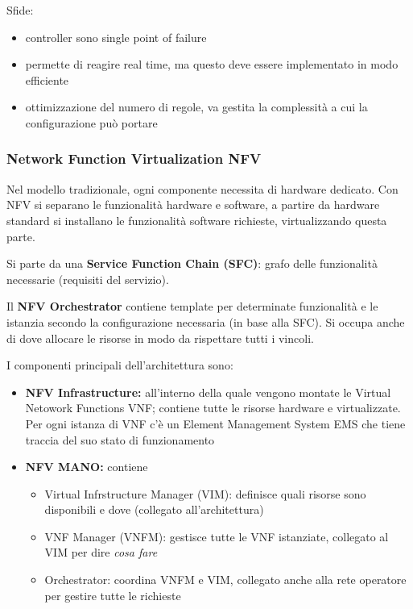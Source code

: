 Sfide: 
\begin{itemize}
    \item controller sono single point of failure
    
    \item permette di reagire real time, ma questo deve essere implementato in modo efficiente
    
    \item ottimizzazione del numero di regole, va gestita la complessità a cui la configurazione può portare
\end{itemize}

\subsubsection{Network Function Virtualization NFV}

Nel modello tradizionale, ogni componente necessita di hardware dedicato. Con NFV si separano le funzionalità hardware e software, a partire da hardware standard si installano le funzionalità software richieste, virtualizzando questa parte. 

Si parte da una \textbf{Service Function Chain (SFC)}: grafo delle funzionalità necessarie (requisiti del servizio).

Il \textbf{NFV Orchestrator} contiene template per determinate funzionalità e le istanzia secondo la configurazione necessaria (in base alla SFC). Si occupa anche di dove allocare le risorse in modo da rispettare tutti i vincoli.

I componenti principali dell'architettura sono: 
\begin{itemize}
    \item \textbf{NFV Infrastructure:} all'interno della quale vengono montate le Virtual Netowork Functions VNF; contiene tutte le risorse hardware e virtualizzate. Per ogni istanza di VNF c'è un Element Management System EMS che tiene traccia del suo stato di funzionamento
    
    \item \textbf{NFV MANO:} contiene
    \begin{itemize}
        \item Virtual Infrstructure Manager (VIM): definisce quali risorse sono disponibili e dove (collegato all'architettura)
        
        \item VNF Manager (VNFM): gestisce tutte le VNF istanziate, collegato al VIM per dire \textit{cosa fare}
        
        \item Orchestrator: coordina VNFM e VIM, collegato anche alla rete operatore per gestire tutte le richieste
    \end{itemize}
\end{itemize}


